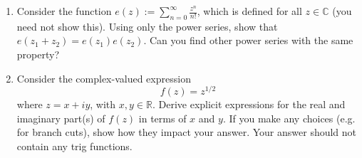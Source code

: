 \documentclass[10pt]{amsart}
\theoremstyle{nonumberplain}
\begin{document}
\begin{enumerate}[label={\bf {\arabic*}:}]
\qed \\
\textbf{Part 2} $(1 + i)^i$ \\
Using the first equation we get
$$(1 + i)^i = e^{i\log{(1 + i)}}.$$
Before we use the next equation, let's determine $\rho$ and $\theta$ for the complex number $i$.
$$\rho = \sqrt{x^2 + y^2} = \sqrt{1^2 + 1^2} = \sqrt{1 + 1} = \sqrt{2}$$
We need to find $\theta$ s.t.
\begin{eqnarray*}
\rho \cos(\theta) = \sqrt{2} \cos(\theta) &=& 1 \\
\rho \sin(\theta) = \sqrt{2} \sin(\theta) &=& 1
\end{eqnarray*}
therefore $\theta = \frac{\pi}{4}$.
Now combining this information with the provided equation for the principal branch of the logarithm we get
\begin{eqnarray*}
(1 + i)^i &=& e^{i\log{(1 + i)}} \\
    &=& e^{i(\log{\sqrt{2}}+i\frac{\pi}{4})} \\
    &=& e^{i(\log{\sqrt{2}}+i^2\frac{\pi}{4})} \\
    &=& e^{(i\log{\sqrt{2}}-\frac{\pi}{4})} \\
    &=& e^{i\log{\sqrt{2}}}e^{-\frac{\pi}{4}} \\
    &=& (\cos(\log{\sqrt{2}}) + i\sin(\log{\sqrt{2}}))e^{-\frac{\pi}{4}} \\
    &=& \frac{\cos(\log{\sqrt{2}})}{e^{\frac{\pi}{4}}} + i\frac{\sin(\log{\sqrt{2}}))}{e^{\frac{\pi}{4}}} \\
    &=& \frac{\cos(\frac{1}{2}\log{2})}{e^{\frac{\pi}{4}}} + i\frac{\sin(\frac{1}{2}\log{2}))}{e^{\frac{\pi}{4}}}.
\end{eqnarray*}
In conclusion, $$\Re{((1 + i)^i)} = \frac{\cos(\frac{1}{2}\log{2})}{e^{\frac{\pi}{4}}} \quad \text{and} \quad \Im{((1 + i)^i)} = \frac{\sin(\frac{1}{2}\log{2}))}{e^{\frac{\pi}{4}}}.$$ \qed \\

\item Consider the function $e(z):=\sum_{n=0}^{\infty}
  \frac{z^n}{n!}$, which is defined for all $z \in \mathbb{C}$ (you
  need not show this). Using only the power series, show that
  $e\left(z_1+z_2\right)=e\left(z_1\right) e\left(z_2\right)$. Can you
  find other power series with the same property? \\

  
\item Consider the complex-valued expression
$$
f(z)=z^{1 / 2}
$$
where $z=x+i y$, with $x, y \in \mathbb{R}$. Derive explicit
expressions for the real and imaginary part(s) of $f(z)$ in terms of
$x$ and $y$. If you make any choices (e.g. for branch cuts), show how
they impact your answer. Your answer should not contain any trig
functions.\\




\end{enumerate}
\end{document}
